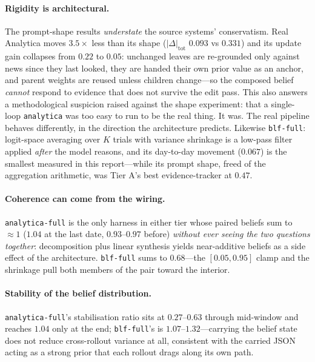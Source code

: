 \documentclass[10pt]{article}
\newcommand{\hr}[1]{\texttt{#1}}
\begin{document}
\paragraph{Rigidity is architectural.} The prompt-shape results \emph{understate} the source
systems' conservatism. Real Analytica moves $3.5\times$ less than its shape
($|\Delta|_\text{tot}$ $0.093$ vs $0.331$) and its update gain collapses from $0.22$ to $0.05$:
unchanged leaves are re-grounded only against news since they last looked, they are handed their
own prior value as an anchor, and parent weights are reused unless children change---so the
composed belief \emph{cannot} respond to evidence that does not survive the edit pass. This also
answers a methodological suspicion raised against the shape experiment: that a single-loop
\hr{analytica} was too easy to run to be the real thing. It was. The real pipeline behaves
differently, in the direction the architecture predicts. Likewise \hr{blf-full}: logit-space
averaging over $K$ trials with variance shrinkage is a low-pass filter applied \emph{after} the
model reasons, and its day-to-day movement ($0.067$) is the smallest measured in this
report---while its prompt shape, freed of the aggregation arithmetic, was Tier A's best
evidence-tracker at $0.47$.

\paragraph{Coherence can come from the wiring.} \hr{analytica-full} is the only harness in either
tier whose paired beliefs sum to ${\approx}1$ ($1.04$ at the last date, $0.93$--$0.97$ before)
\emph{without ever seeing the two questions together}: decomposition plus linear synthesis yields
near-additive beliefs as a side effect of the architecture. \hr{blf-full} sums to
$0.68$---the $[0.05,0.95]$ clamp and the shrinkage pull both members of the pair toward the
interior.

\paragraph{Stability of the belief distribution.} \hr{analytica-full}'s stabilisation ratio sits
at $0.27$--$0.63$ through mid-window and reaches $1.04$ only at the end; \hr{blf-full}'s is
$1.07$--$1.32$---carrying the belief state does not reduce cross-rollout variance at all,
consistent with the carried JSON acting as a strong prior that each rollout drags along its own
path.
\end{document}
